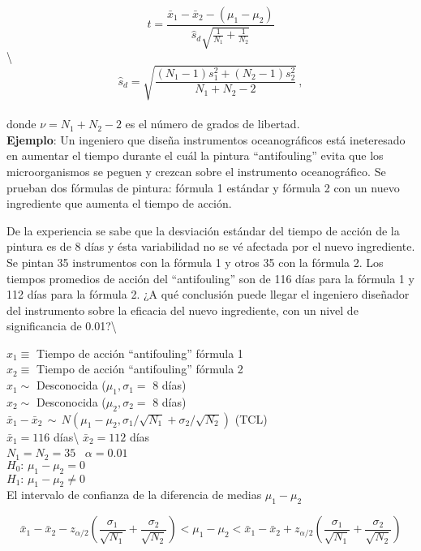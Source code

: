 \documentclass[
]{agujournal2019}
\begin{document}
\[t=\frac{\bar{x}_1-\bar{x}_2-(\mu_1-\mu_2)}
         {\hat{s}_d\sqrt{\frac{1}{N_1}+\frac{1}{N_2}}}\]
\textbackslash{}
\[\hat{s}_d=\sqrt{\frac{(N_1-1)s^2_1 + (N_2-1)s^2_2}{N_1+N_2-2}}\,,\]\\

donde \(\nu=N_1+N_2-2\) es el número de grados de libertad.\\

\textbf{Ejemplo}: Un ingeniero que diseña instrumentos oceanográficos
está ineteresado en aumentar el tiempo durante el cuál la pintura
``antifouling'' evita que los microorganismos se peguen y crezcan sobre
el instrumento oceanográfico. Se prueban dos fórmulas de pintura:
fórmula 1 estándar y fórmula 2 con un nuevo ingrediente que aumenta el
tiempo de acción.

De la experiencia se sabe que la desviación estándar del tiempo de
acción de la pintura es de 8 días y ésta variabilidad no se vé afectada
por el nuevo ingrediente. Se pintan 35 instrumentos con la fórmula 1 y
otros 35 con la fórmula 2. Los tiempos promedios de acción del
``antifouling'' son de 116 días para la fórmula 1 y 112 días para la
fórmula 2. ¿A qué conclusión puede llegar el ingeniero diseñador del
instrumento sobre la eficacia del nuevo ingrediente, con un nivel de
significancia de 0.01?\textbackslash{}

\(x_1\equiv\) Tiempo de acción ``antifouling'' fórmula 1\\

\(x_2\equiv\) Tiempo de acción ``antifouling'' fórmula 2\\
\(x_1\sim\) Desconocida (\(\mu_1,\sigma_1=\) 8 días)\\
\(x_2\sim\) Desconocida (\(\mu_2,\sigma_2=\) 8 días)\\
\(\bar{x}_1-\bar{x}_2\,\sim\,{ N}(\mu_1-\mu_2,\sigma_1/\sqrt{N_1} + \sigma_2/\sqrt{N_2})\)
(TCL)\\
\(\bar{x}_1=116\) días\textbackslash{} \(\bar{x}_2=112\) días\\
\(N_1=N_2=35\)~ \(\alpha=0.01\)\\
\(H_0:\,\mu_1 - \mu_2 =0\)\\
\(H_1:\,\mu_1 - \mu_2 \neq0\)\\

El intervalo de confianza de la diferencia de medias \(\mu_1-\mu_2\)

\[\bar{x}_1-\bar{x}_2-z_{\alpha/2} \left(
   \frac{\sigma_1}{\sqrt{N_1}} + \frac{\sigma_2}{\sqrt{N_2}}\right)<
   \mu_1-\mu_2 <
   \bar{x}_1-\bar{x}_2+z_{\alpha/2} \left(
   \frac{\sigma_1}{\sqrt{N_1}} + \frac{\sigma_2}{\sqrt{N_2}}\right)\]
\end{document}
